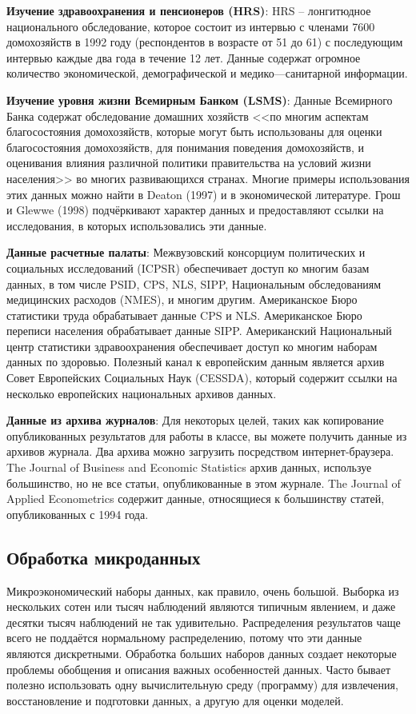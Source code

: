 {\bf Изучение здравоохранения и пенсионеров (HRS)}: HRS -- лонгитюдное национального обследование, которое состоит из интервью с членами 7600 домохозяйств в 1992 году (респондентов в возрасте от 51 до 61) с последующим интервью каждые два года в течение 12 лет. Данные содержат огромное количество экономической, демографической и медико---санитарной информации.


{\bf Изучение уровня жизни Всемирным Банком (LSMS)}: Данные Всемирного Банка содержат обследование домашних хозяйств  <<по многим аспектам благосостояния домохозяйств, которые могут быть использованы для оценки благосостояния домохозяйств, для понимания поведения домохозяйств, и оценивания влияния различной политики правительства на условий жизни населения>> во многих развивающихся странах. Многие примеры использования этих данных можно найти в Deaton (1997) и в экономической литературе. Грош и Glewwe (1998) подчёркивают характер данных и предоставляют ссылки на исследования, в которых использовались эти данные.


{\bf Данные расчетные палаты}: Межвузовский консорциум политических и социальных исследований (ICPSR) обеспечивает доступ ко многим базам данных, в том числе PSID, CPS, NLS, SIPP, Национальным обследованиям медицинских расходов (NMES), и многим другим. Американское Бюро статистики труда обрабатывает данные CPS и NLS. Американское Бюро переписи населения обрабатывает данные SIPP. Американский Национальный центр статистики здравоохранения обеспечивает доступ ко многим наборам данных по здоровью. Полезный канал к европейским данным является архив Совет Европейских Социальных Наук (CESSDA), который содержит ссылки на несколько европейских национальных архивов данных.


{\bf Данные из архива журналов}: Для некоторых целей, таких как копирование опубликованных результатов для работы в классе, вы можете получить данные из архивов журнала. Два архива можно загрузить посредством интернет-браузера. The Journal of Business and Economic Statistics архив данных, используе большинство, но не все статьи, опубликованные в этом журнале. The Journal of Applied Econometrics содержит данные, относящиеся к большинству статей, опубликованных с 1994 года.



\subsection{Обработка микроданных}


Микроэкономический наборы данных, как правило, очень большой. Выборка из нескольких сотен или тысяч наблюдений являются типичным явлением, и даже десятки тысяч наблюдений не так удивительно. Распределения результатов чаще всего не поддаётся нормальному распределению, потому что эти данные являются дискретными. Обработка больших наборов данных создает некоторые проблемы обобщения и описания важных особенностей данных. Часто бывает полезно использовать одну вычислительную среду (программу) для извлечения, восстановление и подготовки данных, а другую для  оценки моделей.


